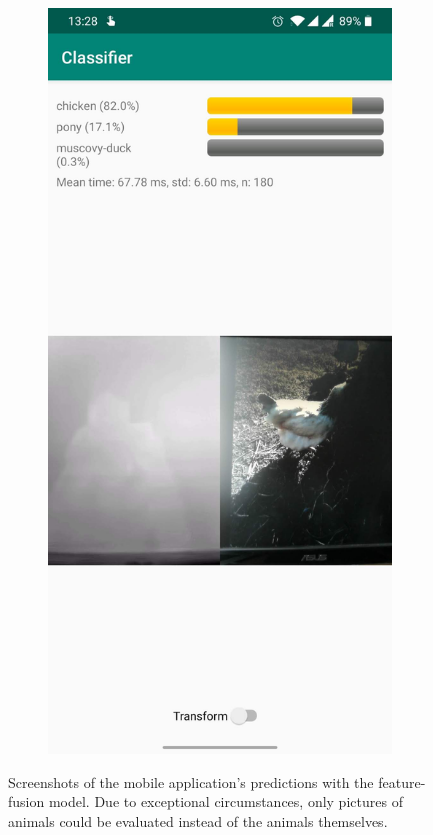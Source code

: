 \documentclass{l4proj}
\begin{document}
\begin{figure}[ht]
\begin{subfigure}[h!]{0.3\textwidth}
  \end{subfigure}
  \begin{subfigure}[h!]{0.3\textwidth}
    \includegraphics[width=\textwidth]{images/app/screenshot_2.jpg}
  \end{subfigure}
  \caption{Screenshots of the mobile application's predictions with the feature-fusion model. Due to exceptional circumstances, only pictures of animals could be evaluated instead of the animals themselves.}
  \label{fig:app_screenshots}
\end{figure}
\end{document}

